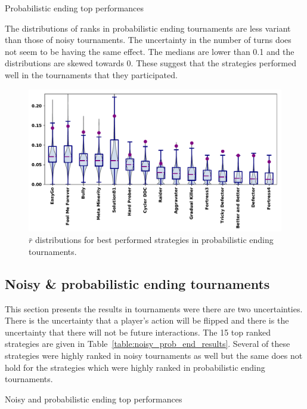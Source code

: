 \documentclass{article}
\begin{document}
\begin{table}[!htbp]
    \centering
    \resizebox{.28\textwidth}{!}{
    }
    \caption{Probabilistic ending top performances}\label{table:prob_end_results}
\end{table}

The distributions of ranks in probabilistic ending tournaments are less variant
than those of noisy tournaments. The uncertainty in the number of turns does not
seem to be having the same effect. The medians are lower than 0.1 and the
distributions are skewed towards 0. These suggest that the strategies performed
well in the tournaments that they participated.

\begin{figure}[!htbp]
    \centering
    \includegraphics[width=.8\textwidth]{../images/performance_probend.pdf}
    \caption{\(\bar{r}\) distributions for best performed strategies in probabilistic ending tournaments.}
    \label{fig:probend_results}
\end{figure}

\subsection{Noisy \& probabilistic ending tournaments}\label{subsection:noisy_probend_tournament}

This section presents the results in tournaments were there are two
uncertainties. There is the uncertainty that a player's action will be flipped
and there is the uncertainty that there will not be future interactions.
The 15 top ranked strategies are given in Table~\ref{table:noisy_prob_end_results}.
Several of these strategies were highly ranked in noisy tournaments as well
but the same does not hold for the strategies which were highly ranked in
probabilistic ending tournaments.

\begin{table}[!htbp]
    \centering
    \resizebox{.28\textwidth}{!}{
    }
    \caption{Noisy and probabilistic ending top performances}\label{table:noisy_prob_end_results}
\end{table}
\end{document}
